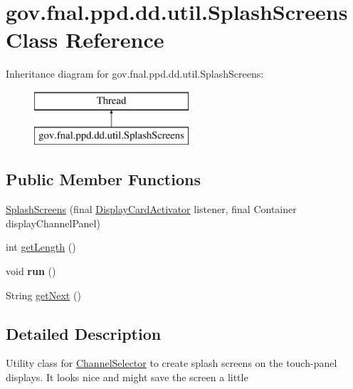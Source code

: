 \hypertarget{classgov_1_1fnal_1_1ppd_1_1dd_1_1util_1_1SplashScreens}{\section{gov.\-fnal.\-ppd.\-dd.\-util.\-Splash\-Screens Class Reference}
\label{classgov_1_1fnal_1_1ppd_1_1dd_1_1util_1_1SplashScreens}
}
Inheritance diagram for gov.\-fnal.\-ppd.\-dd.\-util.\-Splash\-Screens\-:\begin{figure}[H]
\begin{center}
\leavevmode
\includegraphics[height=2.000000cm]{classgov_1_1fnal_1_1ppd_1_1dd_1_1util_1_1SplashScreens}
\end{center}
\end{figure}
\subsection*{Public Member Functions}
\begin{DoxyCompactItemize}
\item 
\hyperlink{classgov_1_1fnal_1_1ppd_1_1dd_1_1util_1_1SplashScreens_a3951a9bd85370e3f2dd19c1607c5f465}{Splash\-Screens} (final \hyperlink{interfacegov_1_1fnal_1_1ppd_1_1dd_1_1util_1_1DisplayCardActivator}{Display\-Card\-Activator} listener, final Container display\-Channel\-Panel)
\item 
int \hyperlink{classgov_1_1fnal_1_1ppd_1_1dd_1_1util_1_1SplashScreens_adb81aa078a65f2a043f96d8db686bd5c}{get\-Length} ()
\item 
\hypertarget{classgov_1_1fnal_1_1ppd_1_1dd_1_1util_1_1SplashScreens_a334862829af49ec6ccbcb9502195c6b3}{void {\bfseries run} ()}\label{classgov_1_1fnal_1_1ppd_1_1dd_1_1util_1_1SplashScreens_a334862829af49ec6ccbcb9502195c6b3}

\item 
String \hyperlink{classgov_1_1fnal_1_1ppd_1_1dd_1_1util_1_1SplashScreens_a7e222fd082c2535e819365fb90bdb603}{get\-Next} ()
\end{DoxyCompactItemize}


\subsection{Detailed Description}
Utility class for \hyperlink{classgov_1_1fnal_1_1ppd_1_1dd_1_1ChannelSelector}{Channel\-Selector} to create splash screens on the touch-\/panel displays. It looks nice and might save the screen a little

